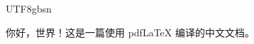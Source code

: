 \documentclass{article}
\begin{document}
\begin{CJK}{UTF8}{gbsn}  %

你好，世界！这是一篇使用 pdfLaTeX 编译的中文文档。

\end{CJK}
\end{document}
